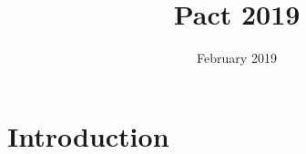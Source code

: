 \documentclass{article}
\title{Pact 2019}
\author{ }
\date{February 2019}
\begin{document}
\maketitle

\section{Introduction}
\end{document}
